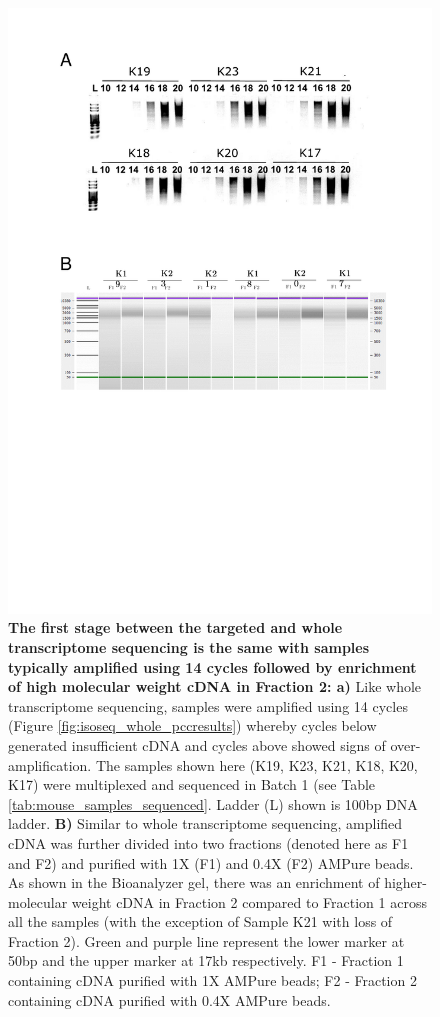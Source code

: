 \begin{figure}[htp]
	\centering
	\vspace{20pt}
	\includegraphics[page=1,trim={0 10cm 0 0cm},clip,scale = 0.75]{Figures/TargetedTranscriptome_ppt.pdf}
	\captionsetup{width=0.95\textwidth}
	\caption[Iso-Seq Targeted Transcriptome - cDNA amplification and purification]%
	{\textbf{The first stage between the targeted and whole transcriptome sequencing is the same with samples typically amplified using 14 cycles followed by enrichment of high molecular weight cDNA in Fraction 2: a)} Like whole transcriptome sequencing, samples were amplified using 14 cycles (Figure \ref{fig:isoseq_whole_pccresults}) whereby cycles below generated insufficient cDNA and cycles above showed signs of over-amplification. The samples shown here (K19, K23, K21, K18, K20, K17) were multiplexed and sequenced in Batch 1 (see Table \ref{tab:mouse_samples_sequenced}. Ladder (L) shown is 100bp DNA ladder. \textbf{B)} Similar to whole transcriptome sequencing, amplified cDNA was further divided into two fractions (denoted here as F1 and F2) and purified with 1X (F1) and 0.4X (F2) AMPure beads. As shown in the Bioanalyzer gel, there was an enrichment of higher-molecular weight cDNA in Fraction 2 compared to Fraction 1 across all the samples (with the exception of Sample K21 with loss of Fraction 2). Green and purple line represent the lower marker at 50bp and the upper marker at 17kb respectively. F1 - Fraction 1 containing cDNA purified with 1X AMPure beads; F2 - Fraction 2 containing cDNA purified with 0.4X AMPure beads.}

\end{figure}
